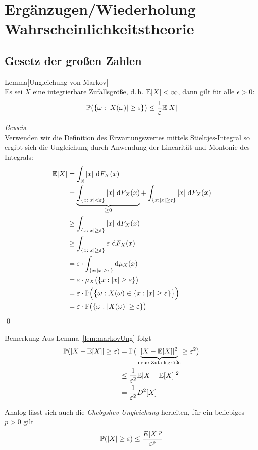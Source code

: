 
\newpage
\section{Ergänzugen/Wiederholung Wahrscheinlichkeitstheorie}

\subsection{Gesetz der großen Zahlen}
\begin{colbox}{Lemma}[Ungleichung von Markov]\label{lem:markovUng}\ \\
    Es sei $X$ eine integrierbare Zufallsgröße, d.\,h. $\E|X|<\infty$, dann gilt für alle $\epsilon>0$:
    \[
    \P\big(\{\omega:|X(\omega)|\geq\epsilon\}\big) \leq \frac{1}{\epsilon}\E|X|
    \]
\end{colbox}
\textit{Beweis.} \\
Verwenden wir die Definition des Erwartungswertes mittels Stieltjes-Integral so ergibt sich die Ungleichung durch 
Anwendung der Linearität und Montonie des Integrals:
\begin{align*}
    \E|X| &= \int_{\R} |x| \, \diff F_X(x) \\
    &= \underbrace{\int_{\{x:|x|<\epsilon\}} |x| \, \diff F_X(x)}_{\geq 0} + 
    \int_{\{x:|x|\geq\epsilon\}} |x| \, \diff F_X(x) \\
    &\geq \int_{\{x:|x|\geq\epsilon\}} |x| \, \diff F_X(x) \\
    &\geq \int_{\{x:|x|\geq\epsilon\}} \epsilon \, \diff F_X(x) \\
    &= \epsilon\cdot \int_{\{x:|x|\geq\epsilon\}} \diff \mu_X(x) \\
    &= \epsilon\cdot\mu_X\big(\{x:|x|\geq\epsilon\}\big) \\
    &= \epsilon\cdot \P\Big(\big\{\omega:X(\omega)\in\{x:|x|\geq\epsilon\}\big\}\Big) \\
    &= \epsilon\cdot \P\big(\{\omega:|X(\omega)|\geq\epsilon\}\big) 
\end{align*}
\qed 
\begin{colbox}{Bemerkung}
    Aus Lemma~\ref{lem:markovUng} folgt
    \begin{align*}
        \P(|X-\E[X]|\geq\epsilon) &= \P\big( \underbrace{|X-\E[X]|^2}_{\text{neue Zufallsgröße}}\geq\epsilon^2\big) \\
        &\leq \frac{1}{\epsilon^2}\E|X-\E[X]|^2 \\
        &= \frac{1}{\epsilon^2} D^2[X]
    \end{align*}
\end{colbox}
Analog lässt sich auch die \emph{Chebyshev Ungleichung} herleiten, für ein beliebiges $p>0$ gilt
\[\P(|X|\geq\epsilon) \leq \frac{E|X|^p}{\varepsilon^p}\]


